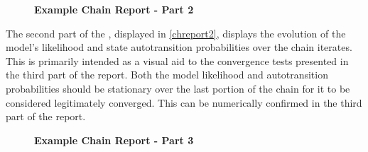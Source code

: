 \documentclass{ut-thesis}
\begin{document}
\begin{NoHyper}
\begin{figure}[!h]
    \caption{{\bf Example \protect{} Chain Report - Part 2}}
    \label{chreport2}
\end{figure}

The second part of the , displayed in \autoref{chreport2}, displays the evolution of the model's likelihood and state autotransition probabilities over the chain iterates. This is primarily intended as a visual aid to the convergence tests presented in the third part of the report. Both the model likelihood and autotransition probabilities should be stationary over the last portion of the chain for it to be considered legitimately converged. This can be numerically confirmed in the third part of the report.

\begin{figure}[!h]
    \caption{{\bf Example \protect{} Chain Report - Part 3}}
    \label{chreport3}
\end{figure}


\end{NoHyper}
\end{document}
